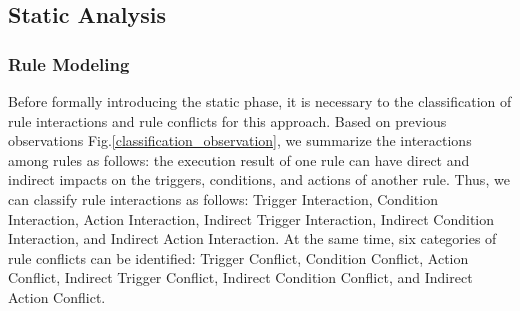 \subsection{Static Analysis}

\subsubsection{Rule Modeling}


Before formally introducing the static phase, it is necessary to the classification of rule interactions and rule conflicts for this approach. Based on previous observations Fig.\ref{classification_observation}, we summarize the interactions among rules as follows: the execution result of one rule can have direct and indirect impacts on the triggers, conditions, and actions of another rule. Thus, we can classify rule interactions as follows: Trigger Interaction, Condition Interaction, Action Interaction, Indirect Trigger Interaction, Indirect Condition Interaction, and Indirect Action Interaction. At the same time, six categories of rule conflicts can be identified: Trigger Conflict, Condition Conflict, Action Conflict, Indirect Trigger Conflict, Indirect Condition Conflict, and Indirect Action Conflict.

